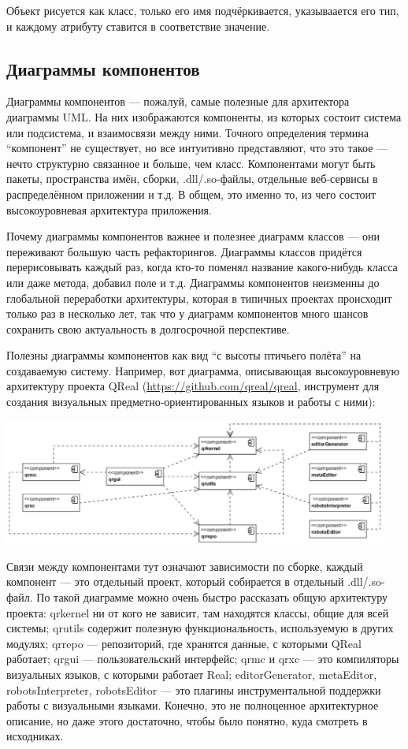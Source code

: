 \documentclass[a5paper]{article}
\begin{document}
Объект рисуется как класс, только его имя подчёркивается, указываается его тип, и каждому атрибуту ставится в соответствие значение.

\subsection{Диаграммы компонентов}

Диаграммы компонентов --- пожалуй, самые полезные для архитектора диаграммы UML. На них изображаются компоненты, из которых состоит система или подсистема, и взаимосвязи между ними. Точного определения термина ``компонент'' не существует, но все интуитивно представляют, что это такое --- нечто структурно связанное и больше, чем класс. Компонентами могут быть пакеты, пространства имён, сборки, .dll/.so-файлы, отдельные веб-сервисы в распределённом приложении и т.д. В общем, это именно то, из чего состоит высокоуровневая архитектура приложения.

Почему диаграммы компонентов важнее и полезнее диаграмм классов --- они переживают большую часть рефакторингов. Диаграммы классов придётся перерисовывать каждый раз, когда кто-то поменял название какого-нибудь класса или даже метода, добавил поле и т.д. Диаграммы компонентов неизменны до глобальной переработки архитектуры, которая в типичных проектах происходит только раз в несколько лет, так что у диаграмм компонентов много шансов сохранить свою актуальность в долгосрочной перспективе.

Полезны диаграммы компонентов как вид ``с высоты птичьего полёта'' на создаваемую систему. Например, вот диаграмма, описывающая высокоуровневую архитектуру проекта QReal (\url{https://github.com/qreal/qreal}, инструмент для создания визуальных предметно-ориентированных языков и работы с ними):

\begin{center}
	\includegraphics[width=0.95\textwidth]{componentDiagrams.png}
\end{center}

Связи между компонентами тут означают зависимости по сборке, каждый компонент --- это отдельный проект, который собирается в отдельный .dll/.so-файл. По такой диаграмме можно очень быстро рассказать общую архитектуру проекта: qrkernel ни от кого не зависит, там находятся классы, общие для всей системы; qrutils содержит полезную функциональность, используемую в других модулях; qrrepo --- репозиторий, где хранятся данные, с которыми QReal работает; qrgui --- пользовательский интерфейс; qrmc и qrxc --- это компиляторы визуальных языков, с которыми работает Real; editorGenerator, metaEditor, robotsInterpreter, robotsEditor --- это плагины инструментальной поддержки работы с визуальными языками. Конечно, это не полноценное архитектурное описание, но даже этого достаточно, чтобы было понятно, куда смотреть в исходниках.
\end{document}
